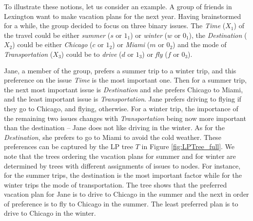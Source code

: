 To illustrate these notions, let us consider an example. A group 
of friends in Lexington want to make vacation plans for the 
next year. Having brainstormed for a while, the group decided to focus 
on three binary issues. The \textit{Time} ($X_1$) of the travel could be 
either \textit{summer} ($s$ or $1_1$) or \textit{winter} ($w$ or $0_1$), 
the \textit{Destination} ($X_2$) could be either \textit{Chicago} 
($c$ or $1_2$) or \textit{Miami} ($m$ or $0_2$) and the mode of 
\textit{Transportation} ($X_3$) could be to \textit{drive} ($d$ or $1_3$)
or \textit{fly} ($f$ or $0_3$).
      
Jane, a member of the group, prefers a summer trip to a winter trip, and 
this preference on the issue \textit{Time} is the most important one.  
Then for a summer trip, the next most important issue is \textit{Destination} 
and she prefers Chicago to Miami, and the least important issue is 
\textit{Transportation}. Jane prefers driving to flying if they go
to Chicago, and flying, otherwise.  For a winter trip, the importance of
the remaining two issues changes with \textit{Transportation} being now
more important than the destination -- Jane does not like 
driving in the winter. As for the \textit{Destination}, she prefers to go 
to Miami to avoid the cold weather. These preferences can be captured by 
the LP tree $T$ in Figure \ref{fig:LPTree_full}. We note that the 
trees ordering the vacation plans for summer and for winter are determined 
by trees with different assignments of issues to nodes. For instance, for 
the summer trips, the destination is the most important factor while 
for the winter trips the mode of transportation. The tree shows that
the preferred vacation plan for Jane is to drive to Chicago in 
the summer and the next in order of preference is to fly to Chicago in the 
summer. The least preferred plan is to drive to Chicago in the winter.

